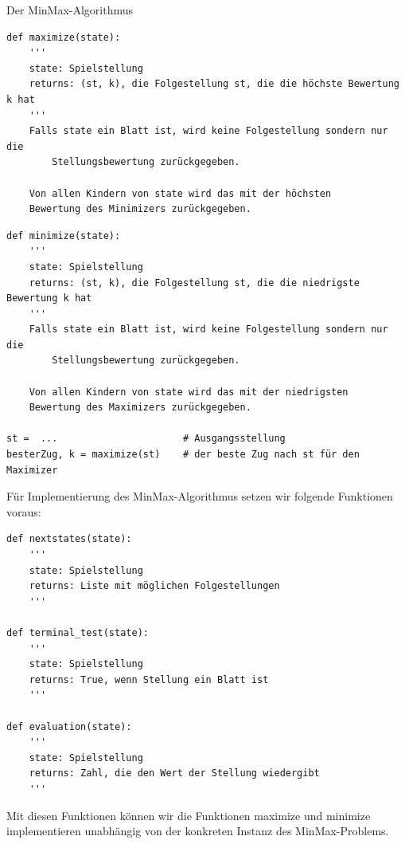 \documentclass{beamer}
\begin{document}
\begin{frame}[fragile]
Der MinMax-Algorithmus
\begin{lstlisting}[basicstyle=\tiny]
def maximize(state):
    '''
    state: Spielstellung
    returns: (st, k), die Folgestellung st, die die höchste Bewertung k hat
    '''
    Falls state ein Blatt ist, wird keine Folgestellung sondern nur die 
        Stellungsbewertung zurückgegeben.
    
    Von allen Kindern von state wird das mit der höchsten
    Bewertung des Minimizers zurückgegeben.
\end{lstlisting} 
\begin{lstlisting}[basicstyle=\tiny]
def minimize(state):
    '''
    state: Spielstellung
    returns: (st, k), die Folgestellung st, die die niedrigste Bewertung k hat
    '''
    Falls state ein Blatt ist, wird keine Folgestellung sondern nur die 
        Stellungsbewertung zurückgegeben.
    
    Von allen Kindern von state wird das mit der niedrigsten
    Bewertung des Maximizers zurückgegeben.
    
st =  ...                      # Ausgangsstellung
besterZug, k = maximize(st)    # der beste Zug nach st für den Maximizer
\end{lstlisting} 
\end{frame}

\begin{frame}[fragile]
Für Implementierung des MinMax-Algorithmus setzen wir folgende Funktionen voraus:
\begin{lstlisting}[basicstyle=\tiny]
def nextstates(state):
    '''
    state: Spielstellung
    returns: Liste mit möglichen Folgestellungen
    '''

def terminal_test(state):
    '''
    state: Spielstellung
    returns: True, wenn Stellung ein Blatt ist
    '''

def evaluation(state):
    '''
    state: Spielstellung
    returns: Zahl, die den Wert der Stellung wiedergibt
    '''
\end{lstlisting} 
Mit diesen Funktionen können wir die Funktionen maximize und minimize implementieren unabhängig von 
der konkreten Instanz des MinMax-Problems.
\end{frame}
\end{document}
